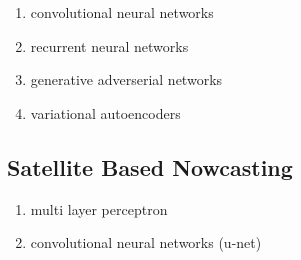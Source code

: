 \documentclass[acmtog, authorversion]{acmart}
\begin{document}
\begin{enumerate}
    \item convolutional neural networks
    \item recurrent neural networks
    \item generative adverserial networks
    \item variational autoencoders
\end{enumerate}

\subsection{Satellite Based Nowcasting}

\begin{enumerate}
    \item multi layer perceptron
    \item convolutional neural networks (u-net)
\end{enumerate}




\end{document}
